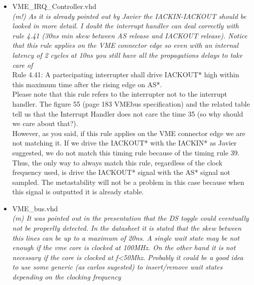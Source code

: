 \documentclass[a4paper,11pt]{article}
\begin{document}
\begin{itemize}
\item VME\_IRQ\_Controller.vhd\\
\textit{(m!) As it is already pointed out by Javier the IACKIN-IACKOUT should be looked in more detail. I doubt the interrupt 
handler can deal correctly with rule 4.41 (30ns min skew between AS release and IACKOUT release). Notice that this rule applies on the VME connector edge so even with an internal latency of 2 cycles at 10ns you still have all the propagations delays to take care of}\\

Rule 4.41: A partecipating interrupter shall drive IACKOUT* high within this maximum time after the rising edge on AS*.\\
Please note that this rule refers to the interrupter not to the interrupt handler. The figure 55 (page 183 VMEbus specification)
and the related table tell us that the Interrupt Handler does not care the time 35 (so why should we care about that?).\\

However, as you said, if this rule applies on the VME connector edge we are not matching it.
If we drive the IACKOUT* with the IACKIN* as Javier suggested, we do not match this timing rule because of the timing rule 39.
Thus, the only way to always match this rule, regardless of the clock frequency used, is drive the IACKOUT* signal with the AS*
signal not sampled. The metastability will not be a problem in this case because when this signal is outputted it is 
already stable.
\item VME\_bus.vhd\\
\textit{(m) It was pointed out in the presentation that the DS toggle could eventually not be properlly detected. In the datasheet it is stated that the skew between this lines can be up to a maximum of 20ns. A single wait state may be not enough if the vme core is clocked at 100MHz. On the other hand it is not necessary if the core is clocked at f<50Mhz. Probably it could be a good idea to use some generic (as carlos sugested) to insert/remove wait states depending on the clocking frequency}\\


\end{itemize}
\end{document}
